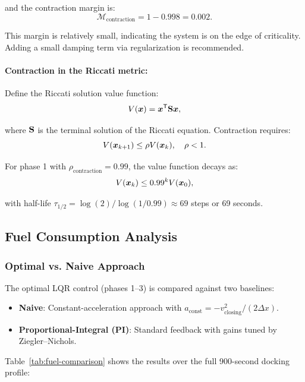 and the contraction margin is:
\begin{equation}
\mathcal{M}_{\text{contraction}} = 1 - 0.998 = 0.002.
\end{equation}

This margin is relatively small, indicating the system is on the edge of criticality.
Adding a small damping term via regularization is recommended.

\paragraph{Contraction in the Riccati metric:}

Define the Riccati solution value function:
\begin{equation}
V(\bm{x}) = \bm{x}^{\mathsf{T}}\mathbf{S}\bm{x},
\end{equation}

where $\mathbf{S}$ is the terminal solution of the Riccati equation. Contraction requires:
\begin{equation}
V(\bm{x}_{k+1}) \le \rho V(\bm{x}_k), \quad \rho < 1.
\end{equation}

For phase 1 with $\rho_{\text{contraction}} = 0.99$, the value function decays as:
\begin{equation}
V(\bm{x}_k) \le 0.99^k V(\bm{x}_0),
\end{equation}

with half-life $\tau_{1/2} = \log(2)/\log(1/0.99) \approx 69$ steps or 69 seconds.

\subsection{Fuel Consumption Analysis}

\subsubsection{Optimal vs. Naive Approach}

The optimal LQR control (phases 1--3) is compared against two baselines:
\begin{itemize}
\item \textbf{Naive}: Constant-acceleration approach with $a_{\text{const}} = -v_{\text{closing}}^2 / (2 \Delta x)$.
\item \textbf{Proportional-Integral (PI)}: Standard feedback with gains tuned by Ziegler--Nichols.
\end{itemize}

Table~\ref{tab:fuel-comparison} shows the results over the full 900-second docking profile:


